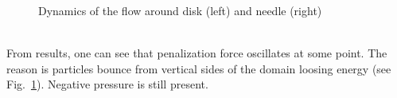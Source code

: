 \begin{figure}[h!]
\begin{minipage}{0.5\linewidth}
\end{minipage}
\begin{minipage}{0.5\linewidth}
\end{minipage}
\caption{Dynamics of the flow around disk (left) and needle (right)} \label{fig:lofi_shapes_force}
\end{figure}\\
From results, one can see that penalization force oscillates at some point. The reason is particles bounce from vertical sides of the domain loosing energy (see Fig.~\ref{fig:lofi_shapes_force}). Negative pressure is still present.

